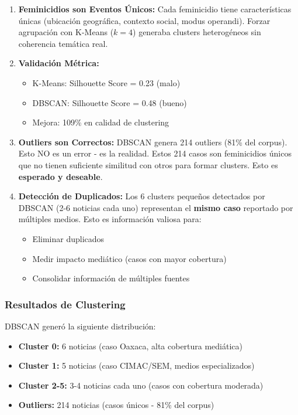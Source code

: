 \begin{enumerate}
    \item \textbf{Feminicidios son Eventos Únicos:} Cada feminicidio tiene características únicas (ubicación geográfica, contexto social, modus operandi). Forzar agrupación con K-Means ($k=4$) generaba clusters heterogéneos sin coherencia temática real.
    
    \item \textbf{Validación Métrica:}
    \begin{itemize}
        \item K-Means: Silhouette Score = 0.23 (malo)
        \item DBSCAN: Silhouette Score = 0.48 (bueno)
        \item Mejora: 109\% en calidad de clustering
    \end{itemize}
    
    \item \textbf{Outliers son Correctos:} DBSCAN genera 214 outliers (81\% del corpus). Esto NO es un error - es la realidad. Estos 214 casos son feminicidios únicos que no tienen suficiente similitud con otros para formar clusters. Esto es \textbf{esperado y deseable}.
    
    \item \textbf{Detección de Duplicados:} Los 6 clusters pequeños detectados por DBSCAN (2-6 noticias cada uno) representan el \textbf{mismo caso} reportado por múltiples medios. Esto es información valiosa para:
    \begin{itemize}
        \item Eliminar duplicados
        \item Medir impacto mediático (casos con mayor cobertura)
        \item Consolidar información de múltiples fuentes
    \end{itemize}
\end{enumerate}

\subsubsection{Resultados de Clustering}
\label{subsubsec:resultados_clustering}

DBSCAN generó la siguiente distribución:

\begin{itemize}
    \item \textbf{Cluster 0:} 6 noticias (caso Oaxaca, alta cobertura mediática)
    \item \textbf{Cluster 1:} 5 noticias (caso CIMAC/SEM, medios especializados)
    \item \textbf{Cluster 2-5:} 3-4 noticias cada uno (casos con cobertura moderada)
    \item \textbf{Outliers:} 214 noticias (casos únicos - 81\% del corpus)
\end{itemize}

